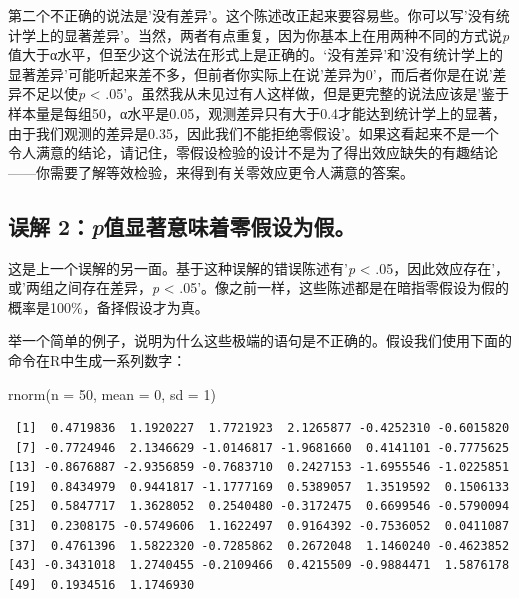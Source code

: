 \documentclass[
  letterpaper,
  DIV=11,
  numbers=noendperiod]{scrreprt}
\newenvironment{Shaded}{\begin{snugshade}}{\end{snugshade}}
\newcommand{\AttributeTok}[1]{\textcolor[rgb]{0.40,0.45,0.13}{#1}}
\newcommand{\DecValTok}[1]{\textcolor[rgb]{0.68,0.00,0.00}{#1}}
\newcommand{\FunctionTok}[1]{\textcolor[rgb]{0.28,0.35,0.67}{#1}}
\newcommand{\NormalTok}[1]{\textcolor[rgb]{0.00,0.23,0.31}{#1}}
\begin{document}
第二个不正确的说法是'没有差异'。这个陈述改正起来要容易些。你可以写'没有统计学上的显著差异'。当然，两者有点重复，因为你基本上在用两种不同的方式说\emph{p}值大于α水平，但至少这个说法在形式上是正确的。`没有差异'和'没有统计学上的显著差异'可能听起来差不多，但前者你实际上在说'差异为0'，而后者你是在说'差异不足以使\emph{p}
\textless{}
.05'。虽然我从未见过有人这样做，但是更完整的说法应该是'鉴于样本量是每组50，α水平是0.05，观测差异只有大于0.4才能达到统计学上的显著，由于我们观测的差异是0.35，因此我们不能拒绝零假设'。如果这看起来不是一个令人满意的结论，请记住，零假设检验的设计不是为了得出效应缺失的有趣结论------你需要了解等效检验，来得到有关零效应更令人满意的答案。

\hypertarget{ux8befux89e3-2pux503cux663eux8457ux610fux5473ux7740ux96f6ux5047ux8bbeux4e3aux5047}{%
\subsection{\texorpdfstring{误解
2：\emph{p}值显著意味着零假设为假。}{误解 2：p值显著意味着零假设为假。}}\label{ux8befux89e3-2pux503cux663eux8457ux610fux5473ux7740ux96f6ux5047ux8bbeux4e3aux5047}}

这是上一个误解的另一面。基于这种误解的错误陈述有'\emph{p} \textless{}
.05，因此效应存在'，或'两组之间存在差异，\emph{p} \textless{}
.05'。像之前一样，这些陈述都是在暗指零假设为假的概率是100\%，备择假设才为真。

举一个简单的例子，说明为什么这些极端的语句是不正确的。假设我们使用下面的命令在R中生成一系列数字：

\begin{Shaded}
\begin{Highlighting}[]
\FunctionTok{rnorm}\NormalTok{(}\AttributeTok{n =} \DecValTok{50}\NormalTok{, }\AttributeTok{mean =} \DecValTok{0}\NormalTok{, }\AttributeTok{sd =} \DecValTok{1}\NormalTok{)}
\end{Highlighting}
\end{Shaded}

\begin{verbatim}
 [1]  0.4719836  1.1920227  1.7721923  2.1265877 -0.4252310 -0.6015820
 [7] -0.7724946  2.1346629 -1.0146817 -1.9681660  0.4141101 -0.7775625
[13] -0.8676887 -2.9356859 -0.7683710  0.2427153 -1.6955546 -1.0225851
[19]  0.8434979  0.9441817 -1.1777169  0.5389057  1.3519592  0.1506133
[25]  0.5847717  1.3628052  0.2540480 -0.3172475  0.6699546 -0.5790094
[31]  0.2308175 -0.5749606  1.1622497  0.9164392 -0.7536052  0.0411087
[37]  0.4761396  1.5822320 -0.7285862  0.2672048  1.1460240 -0.4623852
[43] -0.3431018  1.2740455 -0.2109466  0.4215509 -0.9884471  1.5876178
[49]  0.1934516  1.1746930
\end{verbatim}
\end{document}
